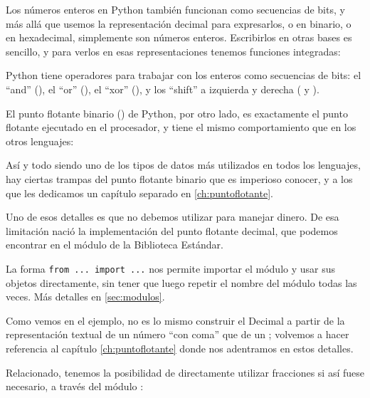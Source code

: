 
Los números enteros en Python también funcionan como secuencias de bits, y más allá que usemos la representación decimal para expresarlos, o en binario, o en hexadecimal, simplemente son números enteros. Escribirlos en otras bases es sencillo, y para verlos en esas representaciones tenemos funciones integradas:


Python tiene operadores para trabajar con los enteros como secuencias de bits: el ``and'' (\mip{&}), el ``or'' (\mip{|}), el ``xor'' (\mip{^}), y los ``shift'' a izquierda y derecha (\mip{<<} y \mip{>>}).


El punto flotante binario () de Python, por otro lado, es exactamente el punto flotante ejecutado en el procesador, y tiene el mismo comportamiento que en los otros lenguajes:


Así y todo siendo uno de los tipos de datos más utilizados en todos los lenguajes, hay ciertas trampas del punto flotante binario que es imperioso conocer, y a los que les dedicamos un capítulo separado en \ref{ch:puntoflotante}.

Uno de esos detalles es que no debemos utilizar  para manejar dinero. De esa limitación nació la implementación del punto flotante decimal, que podemos encontrar en el módulo  de la Biblioteca Estándar.


\begin{info}
La forma \texttt{from ... import ...} nos permite importar el módulo y usar sus objetos directamente, sin tener que luego repetir el nombre del módulo todas las veces. Más detalles en \ref{sec:modulos}.
\end{info}

Como vemos en el ejemplo, no es lo mismo construir el Decimal a partir de la representación textual de un número ``con coma'' que de un ; volvemos a hacer referencia al capítulo \ref{ch:puntoflotante} donde nos adentramos en estos detalles.

Relacionado, tenemos la posibilidad de directamente utilizar fracciones si así fuese necesario, a través del módulo :

